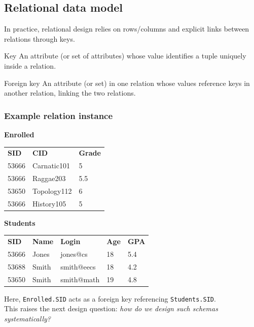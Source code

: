 \documentclass[../../dis.tex]{subfiles}
\begin{document}
\subsection{Relational data model}
In practice, relational design relies on rows/columns and explicit links between relations through keys.

\begin{concept}{Key}\label{def:key}
An attribute (or set of attributes) whose value identifies a tuple uniquely inside a relation.
\end{concept}

\begin{concept}{Foreign key}\label{def:foreignkey}
An attribute (or set) in one relation whose values reference keys in another relation, linking the two relations.
\end{concept}

\subsubsection*{Example relation instance}
\begin{minipage}[t]{0.43\textwidth}
\textbf{Enrolled}
\small
\begin{tabular}{@{}lll@{}}
\textbf{SID} & \textbf{CID} & \textbf{Grade} \\
53666 & Carnatic101 & 5 \\
53666 & Raggae203 & 5.5 \\
53650 & Topology112 & 6 \\
53666 & History105 & 5 \\
\end{tabular}
\normalsize
\end{minipage}
\hfill
\begin{minipage}[t]{0.53\textwidth}
\textbf{Students}
\small
\begin{tabular}{@{}lllll@{}}
\textbf{SID} & \textbf{Name} & \textbf{Login} & \textbf{Age} & \textbf{GPA} \\
53666 & Jones & jones@cs & 18 & 5.4 \\
53688 & Smith & smith@eecs & 18 & 4.2 \\
53650 & Smith & smith@math & 19 & 4.8 \\
\end{tabular}
\normalsize
\end{minipage}

Here, \texttt{Enrolled.SID} acts as a foreign key referencing \texttt{Students.SID}.\\
This raises the next design question: \emph{how do we design such schemas systematically?}
\end{document}
